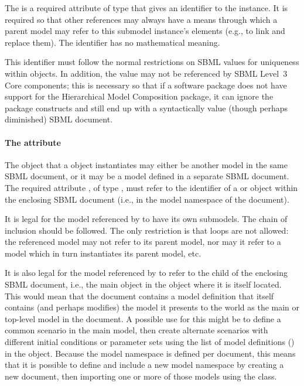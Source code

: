 The  is a required attribute of type  that gives
an identifier to the \Submodel instance.  It is required so that other
references may always have a means through which a parent model may
refer to this submodel instance's elements (e.g., to link and replace
them).  The identifier has no mathematical meaning.

This identifier must follow the normal restrictions on SBML
 values for uniqueness within \Model objects.  In
addition, the  value may not be referenced by SBML Level~3
Core components; this is necessary so that if a software package does
not have support for the Hierarchical Model Composition package, it can
ignore the package constructs and still end up with a syntactically
value (though perhaps diminished) SBML document.  


\paragraph{The \hspace*{1pt} attribute}
  
The \Model object that a \Submodel object instantiates may either be
another model in the same SBML document, or it may be a model defined in
a separate SBML document.  The required attribute , of
type , must refer to the identifier of a \Model or
\ExternalModelDefinition object within the enclosing SBML document
(i.e., in the model namespace of the document).  

It is legal for the model referenced by  to have its own submodels.
The chain of inclusion should be followed.  The only restriction is that
loops are not allowed: the referenced model may not refer to its parent
model, nor may it refer to a model which in turn instantiates its parent
model, etc.

It is also legal for the model referenced by  to refer
to the  child of the enclosing SBML document, i.e., the
main \Model object in the \SBML object where it is itself located.  This
would mean that the document contains a model definition that itself
contains (and perhaps modifies) the model it presents to the world as
the main or top-level model in the document.  A possible use for this
might be to define a common scenario in the main model, then create
alternate scenarios with different initial conditions or parameter sets using the list of
model definitions () in the \SBML object.
Because the model namespace is defined per document, this means that it
is possible to define and include a new model namespace by creating a
new document, then importing one or more of those models using the
\ExternalModelDefinition class.


